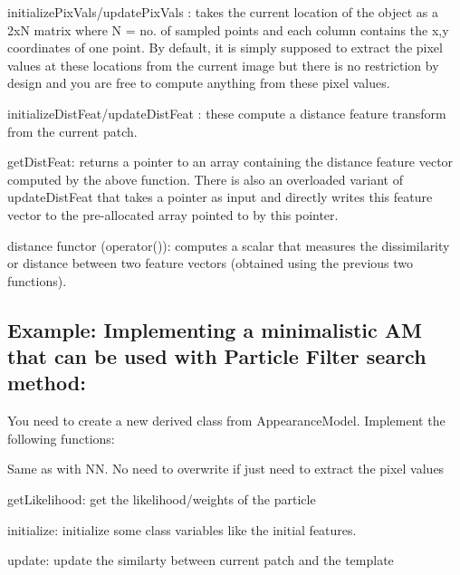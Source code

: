 \begin{DoxyEnumerate}
\item {\ttfamily initialize\-Pix\-Vals/update\-Pix\-Vals} \-: takes the current location of the object as a 2x\-N matrix where N = no. of sampled points and each column contains the x,y coordinates of one point. By default, it is simply supposed to extract the pixel values at these locations from the current image but there is no restriction by design and you are free to compute anything from these pixel values.
\item {\ttfamily initialize\-Dist\-Feat/update\-Dist\-Feat} \-: these compute a distance feature transform from the current patch.
\item {\ttfamily get\-Dist\-Feat}\-: returns a pointer to an array containing the distance feature vector computed by the above function. There is also an overloaded variant of update\-Dist\-Feat that takes a pointer as input and directly writes this feature vector to the pre-\/allocated array pointed to by this pointer.
\item distance functor ({\ttfamily operator()})\-: computes a scalar that measures the dissimilarity or distance between two feature vectors (obtained using the previous two functions).
\end{DoxyEnumerate}

\subsection*{Example\-: Implementing a minimalistic A\-M that can be used with Particle Filter search method\-: }

You need to create a new derived class from Appearance\-Model. Implement the following functions\-:


\begin{DoxyEnumerate}
\item Same as with N\-N. No need to overwrite if just need to extract the pixel values
\item {\ttfamily get\-Likelihood}\-: get the likelihood/weights of the particle
\item {\ttfamily initialize}\-: initialize some class variables like the initial features.
\item {\ttfamily update}\-: update the similarty between current patch and the template 
\end{DoxyEnumerate}